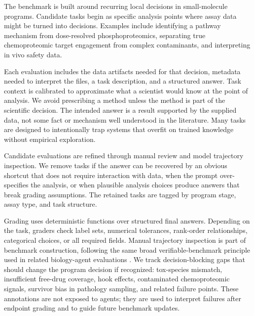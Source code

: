\documentclass[10pt,letterpaper]{article}
\begin{document}
{\begin{minipage}[t]{0.47\textwidth}
\TwoColParaBreak
The benchmark is built around recurring local decisions in small-molecule
programs. Candidate tasks begin as specific analysis points where assay data
might be turned into decisions. Examples include identifying a pathway mechanism
from dose-resolved phosphoproteomics, separating true chemoproteomic target
engagement from complex contaminants, and interpreting in vivo safety data.

\TwoColParaBreak
Each evaluation includes the data artifacts needed for that decision, metadata
needed to interpret the files, a task description, and a structured answer.
Task context is calibrated to approximate what a scientist would know at the
point of analysis. We avoid prescribing a method unless the method is part of
the scientific decision. The intended answer is a result supported by the
supplied data, not some fact or mechanism well understood in the literature.
Many tasks are designed to intentionally trap systems that overfit on trained
knowledge without empirical exploration.

\TwoColParaBreak
Candidate evaluations are refined through manual review and model trajectory
inspection. We remove tasks if the answer can be recovered by an obvious shortcut
that does not require interaction with data, when the prompt over-specifies the
analysis, or when plausible analysis choices produce answers that break grading
assumptions. The retained tasks are tagged by program stage, assay type, and
task structure.

\TwoColParaBreak
Grading uses deterministic functions over structured final answers. Depending
on the task, graders check label sets, numerical tolerances, rank-order
relationships, categorical choices, or all required fields. Manual trajectory
inspection is part of benchmark construction, following the same broad
verifiable-benchmark principle used in related biology-agent evaluations
\cite{spatialbenchlong2026,spatialbench2025,scbench2026}. We track
decision-blocking gaps that should change the program decision if recognized:
tox-species mismatch, insufficient free-drug coverage, hook effects,
contaminated chemoproteomic signals, survivor bias in pathology sampling, and
related failure points. These annotations are not exposed to agents; they are
used to interpret failures after endpoint grading and to guide future benchmark
updates.

\end{minipage}
}

\clearpage
\end{document}
